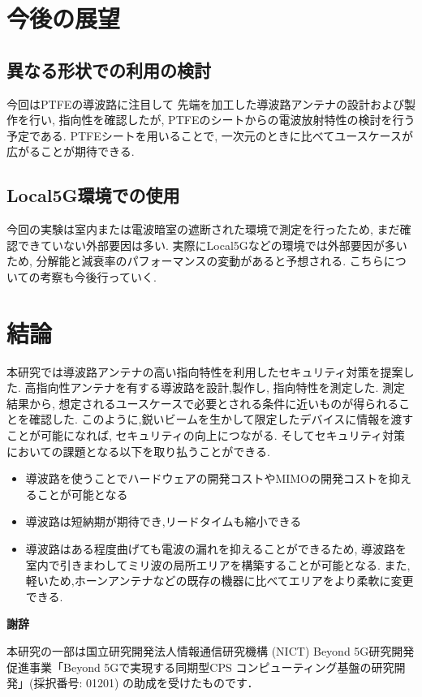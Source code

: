 \documentclass[technicalreport]{ieicej}
\begin{document}
\section{今後の展望}

\subsection{異なる形状での利用の検討}

今回はPTFEの導波路に注目して
先端を加工した導波路アンテナの設計および製作を行い,
指向性を確認したが,
PTFEのシートからの電波放射特性の検討を行う予定である.
PTFEシートを用いることで,
一次元のときに比べてユースケースが広がることが期待できる.

\subsection{Local5G環境での使用}

今回の実験は室内または電波暗室の遮断された環境で測定を行ったため,
まだ確認できていない外部要因は多い.
実際にLocal5Gなどの環境では外部要因が多いため,
分解能と減衰率のパフォーマンスの変動があると予想される.
こちらについての考察も今後行っていく.

\section{結論}

本研究では導波路アンテナの高い指向特性を利用したセキュリティ対策を提案した.
高指向性アンテナを有する導波路を設計,製作し,
指向特性を測定した.
測定結果から,
想定されるユースケースで必要とされる条件に近いものが得られることを確認した.
このように,鋭いビームを生かして限定したデバイスに情報を渡すことが可能になれば,
セキュリティの向上につながる.
そしてセキュリティ対策においての課題となる以下を取り払うことができる.

\begin{itemize}
  \item 導波路を使うことでハードウェアの開発コストやMIMOの開発コストを抑えることが可能となる
  \item 導波路は短納期が期待でき,リードタイムも縮小できる
  \item 導波路はある程度曲げても電波の漏れを抑えることができるため,
  導波路を室内で引きまわしてミリ波の局所エリアを構築することが可能となる.
  また,軽いため,ホーンアンテナなどの既存の機器に比べてエリアをより柔軟に変更できる.
\end{itemize}

\begin{center}
  \Large \textbf{謝辞}
\end{center}

本研究の一部は国立研究開発法人情報通信研究機構 (NICT) 
Beyond 5G研究開発促進事業「Beyond 5Gで実現する同期型CPS
コンピューティング基盤の研究開発」(採択番号: 01201) の助成を受けたものです．

%
%

\end{document}
